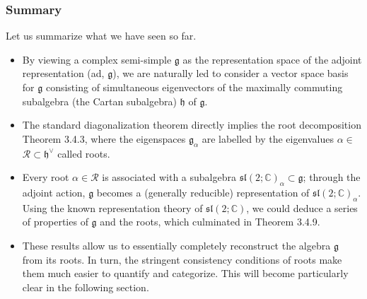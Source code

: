\subsubsection{Summary}

Let us summarize what we have seen so far.
\begin{itemize}
    \item By viewing a complex semi-simple \(\mathfrak{g}\) as the representation space of the adjoint
          representation (ad, \(\mathfrak{g}\)), we are naturally led to consider a vector space basis for \(\mathfrak{g}\) consisting of simultaneous eigenvectors of the maximally commuting subalgebra (the Cartan subalgebra) \(\mathfrak{h}\) of \(\mathfrak{g}\).
    \item The standard diagonalization theorem directly implies the root decomposition Theorem 3.4.3, where the eigenspaces \(\mathfrak{g}_{\alpha}\) are labelled by the eigenvalues \(\alpha \in\) \(\mathcal{R} \subset \mathfrak{h}^{\vee}\)  called roots.
    \item Every root \(\alpha \in \mathcal{R}\) is associated with a subalgebra \(\mathfrak{sl}(2; \mathbb{C})_{\alpha} \subset \mathfrak{g}\); through the adjoint action, \(\mathfrak{g}\) becomes a (generally reducible) representation of \(\mathfrak{sl}(2; \mathbb{C})_{\alpha}\). Using the known representation theory of \(\mathfrak{sl}(2; \mathbb{C})\), we could deduce a series of properties of \(\mathfrak{g}\) and the roots, which culminated in Theorem 3.4.9.
    \item These results allow us to essentially completely reconstruct the algebra \(\mathfrak{g}\) from its roots. In turn, the stringent consistency conditions of roots make them much easier to quantify and categorize. This will become particularly clear in the following section.
\end{itemize}